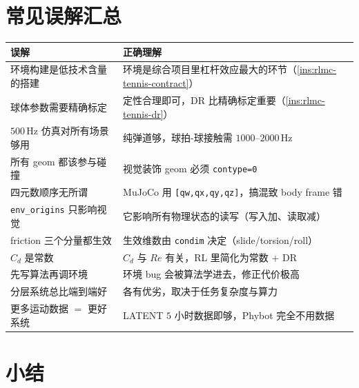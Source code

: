 \section*{常见误解汇总}
\label{sec:rlmc-tennis-myths}

\begin{center}
\small
\begin{tabular}{@{}p{6.0cm}p{7.5cm}@{}}
\toprule
误解 & 正确理解 \\
\midrule
环境构建是低技术含量的搭建 & 环境是综合项目里杠杆效应最大的环节（\cref{ins:rlmc-tennis-contract}） \\
球体参数需要精确标定 & 定性合理即可，DR 比精确标定重要（\cref{ins:rlmc-tennis-dr}） \\
$500$\,Hz 仿真对所有场景够用 & 纯弹道够，球拍-球接触需 $1000$--$2000$\,Hz \\
所有 geom 都该参与碰撞 & 视觉装饰 geom 必须 \verb|contype=0| \\
四元数顺序无所谓 & MuJoCo 用 \verb|[qw,qx,qy,qz]|，搞混致 body frame 错 \\
\verb|env_origins| 只影响视觉 & 它影响所有物理状态的读写（写入加、读取减） \\
friction 三个分量都生效 & 生效维数由 \verb|condim| 决定（slide/torsion/roll） \\
$C_d$ 是常数 & $C_d$ 与 $Re$ 有关，RL 里简化为常数 $+$ DR \\
先写算法再调环境 & 环境 bug 会被算法学进去，修正代价极高 \\
分层系统总比端到端好 & 各有优劣，取决于任务复杂度与算力 \\
更多运动数据 $=$ 更好系统 & LATENT $5$ 小时数据即够，Phybot 完全不用数据 \\
\bottomrule
\end{tabular}
\end{center}

\section*{小结}
\label{sec:rlmc-tennis-summary}

